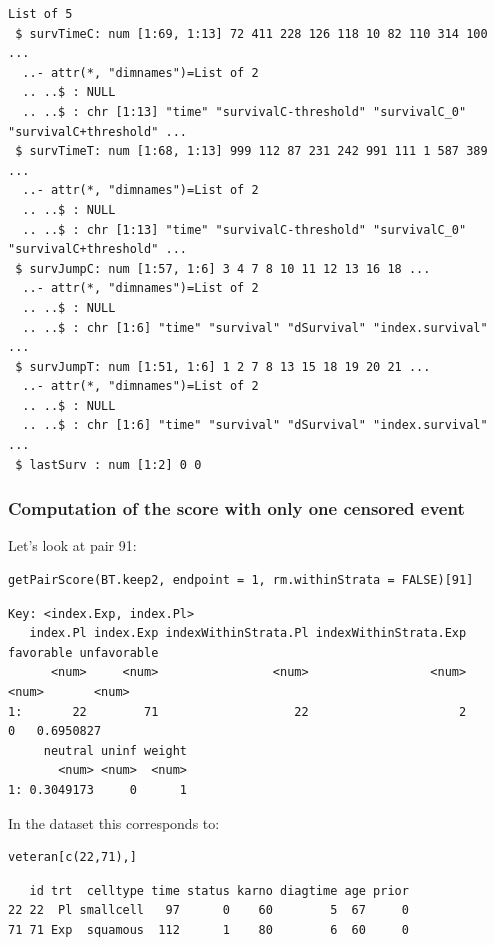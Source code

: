 \documentclass[12pt]{article}
\begin{document}
\begin{verbatim}
List of 5
 $ survTimeC: num [1:69, 1:13] 72 411 228 126 118 10 82 110 314 100 ...
  ..- attr(*, "dimnames")=List of 2
  .. ..$ : NULL
  .. ..$ : chr [1:13] "time" "survivalC-threshold" "survivalC_0" "survivalC+threshold" ...
 $ survTimeT: num [1:68, 1:13] 999 112 87 231 242 991 111 1 587 389 ...
  ..- attr(*, "dimnames")=List of 2
  .. ..$ : NULL
  .. ..$ : chr [1:13] "time" "survivalC-threshold" "survivalC_0" "survivalC+threshold" ...
 $ survJumpC: num [1:57, 1:6] 3 4 7 8 10 11 12 13 16 18 ...
  ..- attr(*, "dimnames")=List of 2
  .. ..$ : NULL
  .. ..$ : chr [1:6] "time" "survival" "dSurvival" "index.survival" ...
 $ survJumpT: num [1:51, 1:6] 1 2 7 8 13 15 18 19 20 21 ...
  ..- attr(*, "dimnames")=List of 2
  .. ..$ : NULL
  .. ..$ : chr [1:6] "time" "survival" "dSurvival" "index.survival" ...
 $ lastSurv : num [1:2] 0 0
\end{verbatim}

\subsubsection{Computation of the score with only one censored event}
\label{sec:org128a361}

Let's look at pair 91:
\lstset{language=r,label= ,caption= ,captionpos=b,numbers=none}
\begin{lstlisting}
getPairScore(BT.keep2, endpoint = 1, rm.withinStrata = FALSE)[91]
\end{lstlisting}

\begin{verbatim}
Key: <index.Exp, index.Pl>
   index.Pl index.Exp indexWithinStrata.Pl indexWithinStrata.Exp favorable unfavorable
      <num>     <num>                <num>                 <num>     <num>       <num>
1:       22        71                   22                     2         0   0.6950827
     neutral uninf weight
       <num> <num>  <num>
1: 0.3049173     0      1
\end{verbatim}


In the dataset this corresponds to:
\lstset{language=r,label= ,caption= ,captionpos=b,numbers=none}
\begin{lstlisting}
veteran[c(22,71),]
\end{lstlisting}

\begin{verbatim}
   id trt  celltype time status karno diagtime age prior
22 22  Pl smallcell   97      0    60        5  67     0
71 71 Exp  squamous  112      1    80        6  60     0
\end{verbatim}
\end{document}
